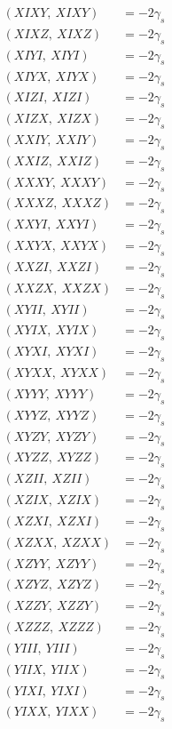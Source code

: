 \documentclass{article}
\begin{document}
\begin{align*}
  (XIXY,\ XIXY) &= - 2 \gamma_{s} \\
  (XIXZ,\ XIXZ) &= - 2 \gamma_{s} \\
  (XIYI,\ XIYI) &= - 2 \gamma_{s} \\
  (XIYX,\ XIYX) &= - 2 \gamma_{s} \\
  (XIZI,\ XIZI) &= - 2 \gamma_{s} \\
  (XIZX,\ XIZX) &= - 2 \gamma_{s} \\
  (XXIY,\ XXIY) &= - 2 \gamma_{s} \\
  (XXIZ,\ XXIZ) &= - 2 \gamma_{s} \\
  (XXXY,\ XXXY) &= - 2 \gamma_{s} \\
  (XXXZ,\ XXXZ) &= - 2 \gamma_{s} \\
  (XXYI,\ XXYI) &= - 2 \gamma_{s} \\
  (XXYX,\ XXYX) &= - 2 \gamma_{s} \\
  (XXZI,\ XXZI) &= - 2 \gamma_{s} \\
  (XXZX,\ XXZX) &= - 2 \gamma_{s} \\
  (XYII,\ XYII) &= - 2 \gamma_{s} \\
  (XYIX,\ XYIX) &= - 2 \gamma_{s} \\
  (XYXI,\ XYXI) &= - 2 \gamma_{s} \\
  (XYXX,\ XYXX) &= - 2 \gamma_{s} \\
  (XYYY,\ XYYY) &= - 2 \gamma_{s} \\
  (XYYZ,\ XYYZ) &= - 2 \gamma_{s} \\
  (XYZY,\ XYZY) &= - 2 \gamma_{s} \\
  (XYZZ,\ XYZZ) &= - 2 \gamma_{s} \\
  (XZII,\ XZII) &= - 2 \gamma_{s} \\
  (XZIX,\ XZIX) &= - 2 \gamma_{s} \\
  (XZXI,\ XZXI) &= - 2 \gamma_{s} \\
  (XZXX,\ XZXX) &= - 2 \gamma_{s} \\
  (XZYY,\ XZYY) &= - 2 \gamma_{s} \\
  (XZYZ,\ XZYZ) &= - 2 \gamma_{s} \\
  (XZZY,\ XZZY) &= - 2 \gamma_{s} \\
  (XZZZ,\ XZZZ) &= - 2 \gamma_{s} \\
  (YIII,\ YIII) &= - 2 \gamma_{s} \\
  (YIIX,\ YIIX) &= - 2 \gamma_{s} \\
  (YIXI,\ YIXI) &= - 2 \gamma_{s} \\
  (YIXX,\ YIXX) &= - 2 \gamma_{s} \\

\end{align*}
\end{document}

